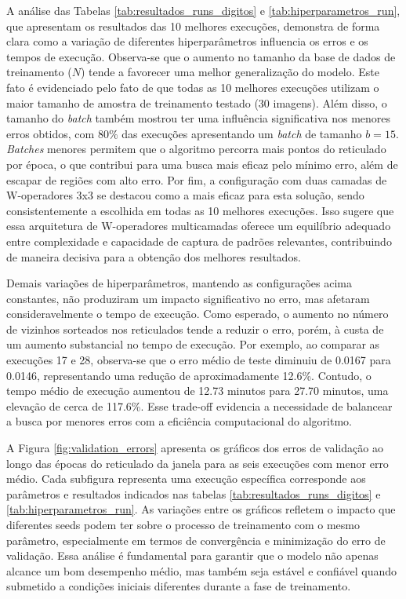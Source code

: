 A análise das Tabelas \ref{tab:resultados_runs_digitos} e \ref{tab:hiperparametros_run}, que apresentam os resultados das 10 melhores execuções, demonstra de forma clara como a variação de diferentes hiperparâmetros influencia os erros e os tempos de execução. Observa-se que o aumento no tamanho da base de dados de treinamento ($N$) tende a favorecer uma melhor generalização do modelo. Este fato é evidenciado pelo fato de que todas as 10 melhores execuções utilizam o maior tamanho de amostra de treinamento testado (30 imagens). Além disso, o tamanho do \textit{batch} também mostrou ter uma influência significativa nos menores erros obtidos, com $80\%$ das execuções apresentando um \textit{batch} de tamanho $b=15$. \textit{Batches} menores permitem que o algoritmo percorra mais pontos do reticulado por época, o que contribui para uma busca mais eficaz pelo mínimo erro, além de escapar de regiões com alto erro. Por fim, a configuração com duas camadas de W-operadores 3x3 se destacou como a mais eficaz para esta solução, sendo consistentemente a escolhida em todas as 10 melhores execuções. Isso sugere que essa arquitetura de W-operadores multicamadas oferece um equilíbrio adequado entre complexidade e capacidade de captura de padrões relevantes, contribuindo de maneira decisiva para a obtenção dos melhores resultados.

Demais variações de hiperparâmetros, mantendo as configurações acima constantes, não produziram um impacto significativo no erro, mas afetaram consideravelmente o tempo de execução. Como esperado, o aumento no número de vizinhos sorteados nos reticulados tende a reduzir o erro, porém, à custa de um aumento substancial no tempo de execução. Por exemplo, ao comparar as execuções 17 e 28, observa-se que o erro médio de teste diminuiu de 0.0167 para 0.0146, representando uma redução de aproximadamente 12.6\%. Contudo, o tempo médio de execução aumentou de 12.73 minutos para 27.70 minutos, uma elevação de cerca de 117.6\%. Esse trade-off evidencia a necessidade de balancear a busca por menores erros com a eficiência computacional do algoritmo.

A Figura \ref{fig:validation_errors} apresenta os gráficos dos erros de validação ao longo das épocas do reticulado da janela para as seis execuções com menor erro médio. Cada subfigura representa uma execução específica corresponde aos parâmetros e resultados indicados nas tabelas \ref{tab:resultados_runs_digitos} e \ref{tab:hiperparametros_run}. As variações entre os gráficos refletem o impacto que diferentes seeds podem ter sobre o processo de treinamento com o mesmo parâmetro, especialmente em termos de convergência e minimização do erro de validação. Essa análise é fundamental para garantir que o modelo não apenas alcance um bom desempenho médio, mas também seja estável e confiável quando submetido a condições iniciais diferentes durante a fase de treinamento.

